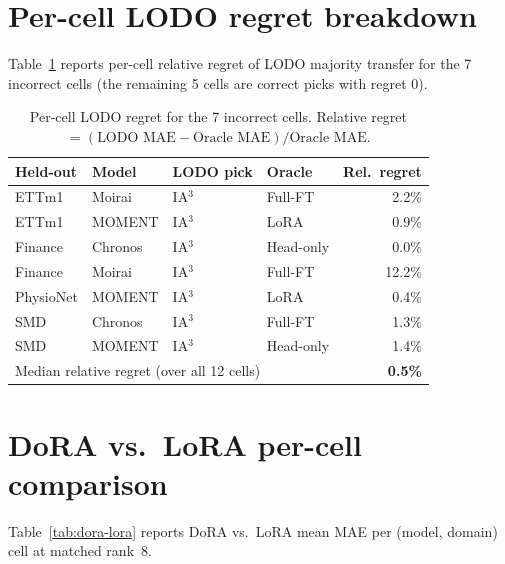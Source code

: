 
\section{Per-cell LODO regret breakdown}
\label{sec:lodo-regret-app}
Table~\ref{tab:lodo-regret} reports per-cell relative regret of LODO majority transfer for the 7 incorrect cells (the remaining 5 cells are correct picks with regret 0).

\begin{table}[ht]
\centering
\caption{Per-cell LODO regret for the 7 incorrect cells. Relative regret $= (\text{LODO MAE} - \text{Oracle MAE}) / \text{Oracle MAE}$.}
\label{tab:lodo-regret}
\small
\begin{tabular}{llllr}
\toprule
Held-out & Model & LODO pick & Oracle & Rel.\ regret \\
\midrule
ETTm1 & Moirai & IA$^3$ & Full-FT & 2.2\% \\
ETTm1 & MOMENT & IA$^3$ & LoRA & 0.9\% \\
Finance & Chronos & IA$^3$ & Head-only & 0.0\% \\
Finance & Moirai & IA$^3$ & Full-FT & 12.2\% \\
PhysioNet & MOMENT & IA$^3$ & LoRA & 0.4\% \\
SMD & Chronos & IA$^3$ & Full-FT & 1.3\% \\
SMD & MOMENT & IA$^3$ & Head-only & 1.4\% \\
\midrule
\multicolumn{4}{l}{Median relative regret (over all 12 cells)} & \textbf{0.5\%} \\
\bottomrule
\end{tabular}
\end{table}

\section{DoRA vs.\ LoRA per-cell comparison}
\label{sec:dora-app}
Table~\ref{tab:dora-lora} reports DoRA vs.\ LoRA mean MAE per (model, domain) cell at matched rank~8.

